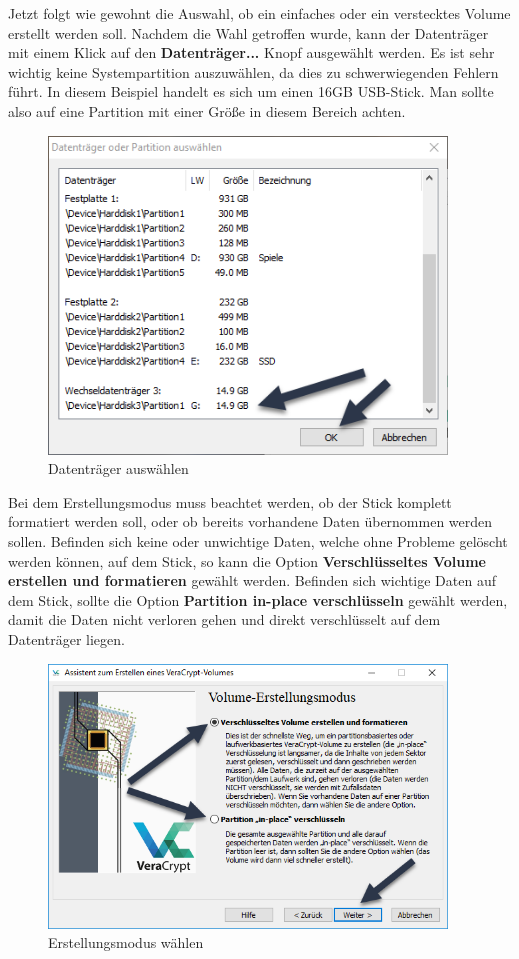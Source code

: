 \documentclass[12pt,a4paper]{scrreprt}
\begin{document}
\noindent Jetzt folgt wie gewohnt die Auswahl, ob ein einfaches oder ein verstecktes Volume erstellt werden soll. Nachdem die Wahl getroffen wurde, kann der Datenträger mit einem Klick auf den \textbf{Datenträger...} Knopf ausgewählt werden. Es ist sehr wichtig keine Systempartition auszuwählen, da dies zu schwerwiegenden Fehlern führt. In diesem Beispiel handelt es sich um einen 16GB USB-Stick. Man sollte also auf eine Partition mit einer Größe in diesem Bereich achten.

\begin{figure}[h]
\begin{center}
\includegraphics[width=300pt]{media/selectdevice.png}
\caption{Datenträger auswählen}
\label{selectdevice}
\end{center}
\end{figure}

\newpage

\noindent Bei dem Erstellungsmodus muss beachtet werden, ob der Stick komplett formatiert werden soll, oder ob bereits vorhandene Daten übernommen werden sollen. Befinden sich keine oder unwichtige Daten, welche ohne Probleme gelöscht werden können, auf dem Stick, so kann die Option \textbf{Verschlüsseltes Volume erstellen und formatieren} gewählt werden. Befinden sich wichtige Daten auf dem Stick, sollte die Option \textbf{Partition \glqq in-place\grqq{} verschlüsseln} gewählt werden, damit die Daten nicht verloren gehen und direkt verschlüsselt auf dem Datenträger liegen.

\begin{figure}[h]
\begin{center}
\includegraphics[width=300pt]{media/creationmode.png}
\caption{Erstellungsmodus wählen}
\label{creationmode}
\end{center}
\end{figure}
\end{document}
